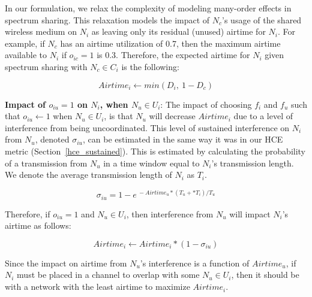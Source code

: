 In our formulation, we relax the complexity of modeling many-order effects in spectrum sharing.    This relaxation models the impact of $N_c$'s usage of the shared wireless medium on $N_i$ as leaving only its residual (unused) airtime for $N_i$.  For example, if $N_c$ has an airtime utilization of 0.7, then the maximum airtime available to $N_i$ if $o_{ic}=1$ is 0.3.  Therefore, the expected airtime for $N_i$ given spectrum sharing with $N_c \in C_i$ is the following:

\vspace{-0.15in}
\begin{equation}
\label{eq:resid}
Airtime_i \leftarrow min(D_i, ~1 - D_c)
\end{equation}


\textbf{Impact of $o_{iu}=1$ on $N_i$, when $N_u \in U_i$}: The impact of choosing $f_i$ and $f_u$ such that $o_{iu}\leftarrow 1$ when $N_u \in U_i$, is that $N_u$ will decrease $Airtime_i$ due to a level of interference from being uncoordinated.  This level of sustained interference on $N_i$ from $N_u$, denoted $\sigma_{iu}$, can be estimated in the same way it was in our HCE metric (Section~\ref{hce_sustained}).  This is estimated by calculating the probability of a transmission from $N_u$ in a time window equal to $N_i$'s transmission length.  We denote the average transmission length of $N_i$ as $T_i$.  

\vspace{-0.15in}
\begin{equation}
\sigma_{iu} = 1 - e^{~-Airtime_u*(T_u+* T_i)/T_u }
\end{equation}

\noindent Therefore, if $o_{iu}=1$ and $N_u \in U_i$, then interference from $N_u$ will impact $N_i$'s airtime as follows:

\vspace{-0.15in}
\begin{equation}
Airtime_i \leftarrow Airtime_i * (1-\sigma_{iu})
\end{equation}

\noindent Since the impact on airtime from $N_u$'s interference is a function of $Airtime_u$, if $N_i$ must be placed in a channel to overlap with some $N_u \in U_i$, then it should be with a network with the least airtime to maximize $Airtime_i$. 






